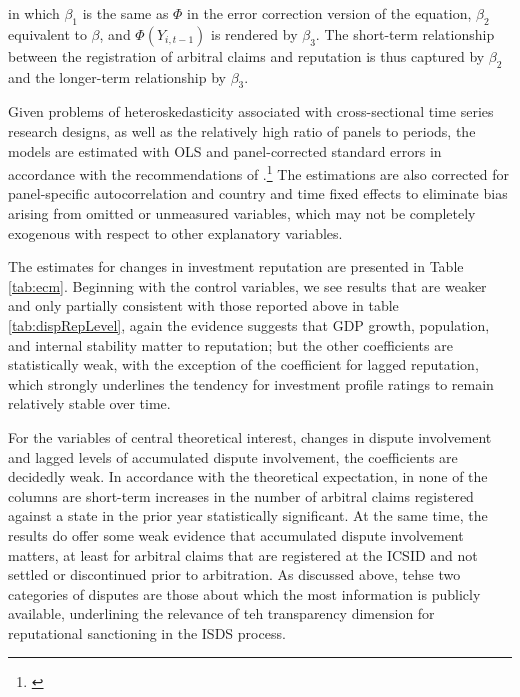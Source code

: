 \documentclass[12pt,onesided]{amsart}
\begin{document}
in which $\beta_{1}$ is the same as $\Phi$ in the error correction version of the equation, $\beta_{2}$ equivalent to $\beta$, and $\Phi(Y_{i,t-1})$ is rendered by $\beta_{3}$. The short-term relationship between the registration of arbitral claims and reputation is thus captured by $\beta_{2}$  and the longer-term relationship by $\beta_{3}$.

Given problems of heteroskedasticity associated with cross-sectional time series research designs, as well as the relatively high ratio of panels to periods, the models are estimated with OLS and panel-corrected standard errors in accordance with the recommendations of \citeauthor{beck:katz:1995}.\footnote{\citet{beck:katz:1995}} The estimations are also corrected for panel-specific autocorrelation and country and time fixed effects to eliminate bias arising from omitted or unmeasured variables, which may not be completely exogenous with respect to other explanatory variables.

The estimates for changes in investment reputation are presented in Table \ref{tab:ecm}. Beginning with the control variables, we see results that are weaker and only partially consistent with those reported above in table \ref{tab:dispRepLevel}, again the evidence suggests that GDP growth, population, and internal stability matter to reputation; but the other coefficients are statistically weak, with the exception of the coefficient for lagged reputation, which strongly underlines the tendency for investment profile ratings to remain relatively stable over time. 

For the variables of central theoretical interest, changes in dispute involvement and lagged levels of accumulated dispute involvement, the coefficients are decidedly weak. In accordance with the theoretical expectation, in none of the columns are short-term increases in the number of arbitral claims registered against a state in the prior year statistically significant. At the same time, the results do offer some weak evidence that accumulated dispute involvement matters, at least for arbitral claims that are registered at the ICSID and not settled or discontinued prior to arbitration. As discussed above, tehse two categories of disputes are those about which the most information is publicly available, underlining the relevance of teh transparency dimension for reputational sanctioning in the ISDS process. 

\end{document}
